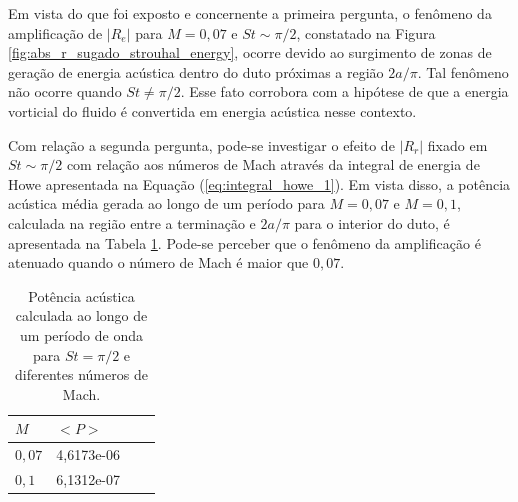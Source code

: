 Em vista do que foi exposto e concernente a primeira pergunta, o fenômeno da amplificação de $|R_{e}|$ para $M = 0,07$ e $St \sim \pi/2$, constatado na Figura \ref{fig:abs_r_sugado_strouhal_energy}, ocorre devido ao surgimento de zonas de geração de energia acústica dentro do duto próximas a região $2a/\pi$. Tal fenômeno não ocorre quando $St \neq \pi/2$. Esse fato corrobora com a hipótese de que a energia vorticial do fluido é convertida em energia acústica nesse contexto.

Com relação a segunda pergunta, pode-se investigar o efeito de $|R_{r}|$ fixado em $St \sim \pi/2$ com relação aos números de Mach através da integral de energia de Howe apresentada na Equação (\ref{eq:integral_howe_1}). Em vista disso, a potência acústica média gerada ao longo de um período para $M = 0,07$ e $M = 0,1$, calculada na região entre a terminação e $2a/\pi$ para o interior do duto, é apresentada na Tabela \ref{table:potencia_mach}. Pode-se perceber que o fenômeno da amplificação é atenuado quando o número de Mach é maior que $0,07$. 

\begin{table}[ht!]
\centering
\caption{Potência acústica calculada ao longo de um período de onda para $St = \pi/2$ e diferentes números de Mach.}
\label{table:potencia_mach}
    \begin{tabular}{|l|l|l|l|}
        \hline
        $M$ & $<P>$ \\ \hline
        $0,07$ & 4,6173e-06  \\ \hline  
        $0,1$ & 6,1312e-07 \\ \hline
    \end{tabular}
\end{table}

